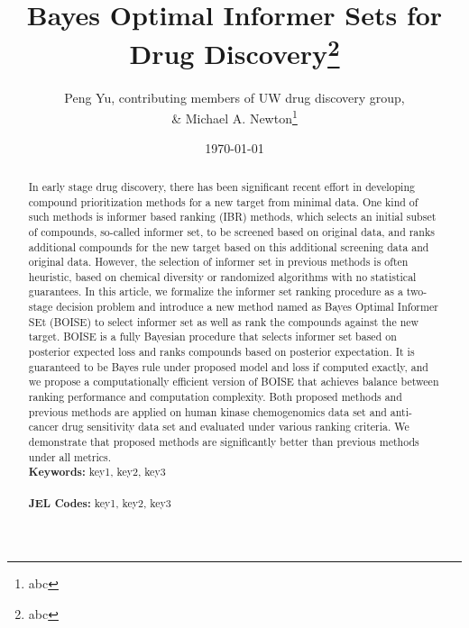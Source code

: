 \documentclass[12pt]{article}
\begin{document}
\begin{titlepage}
\title{Bayes Optimal Informer Sets for Drug Discovery\thanks{abc}}
\author{Peng Yu, {\sc contributing members of UW drug discovery group}, \\  \& Michael A. Newton\thanks{abc}}
\date{\today}
\maketitle
\begin{abstract}
In early stage drug discovery, there has been significant recent effort in developing compound prioritization methods for a new target from minimal data. One kind of such methods is informer based ranking (IBR) methods, which selects an initial subset of compounds, so-called informer set, to be screened based on original data, and ranks additional compounds for the new target based on this additional screening data and original data. However, the selection of informer set in previous methods is often heuristic, based on chemical diversity or randomized algorithms with no statistical guarantees. In this article, we  formalize the informer set ranking procedure as a two-stage decision problem and introduce a new method named as Bayes Optimal Informer SEt (BOISE) to select informer set as well as rank the compounds against the new target. BOISE is a fully Bayesian procedure that selects informer set based on posterior expected loss and ranks compounds based on posterior expectation. It is guaranteed to be Bayes rule under proposed model and loss if computed exactly, and we propose a computationally efficient version of BOISE that achieves balance between ranking performance and computation complexity. Both proposed methods and previous methods are applied on human kinase chemogenomics data set and anti-cancer drug sensitivity data set and evaluated under various ranking criteria. We demonstrate that proposed methods are significantly better than previous methods under all metrics. 
\vspace{0in}\\
\noindent\textbf{Keywords:} key1, key2, key3\\
\vspace{0in}\\
\noindent\textbf{JEL Codes:} key1, key2, key3\\

\bigskip
\end{abstract}
\setcounter{page}{0}
\thispagestyle{empty}
\end{titlepage}
\pagebreak \newpage
\end{document}
